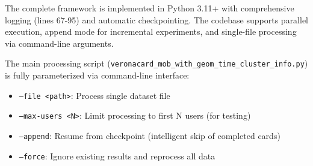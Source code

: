 \documentclass{article}
\begin{document}
The complete framework is implemented in Python 3.11+ with comprehensive logging (lines 67-95) and automatic checkpointing. The codebase supports parallel execution, append mode for incremental experiments, and single-file processing via command-line arguments.

The main processing script (\texttt{veronacard\_mob\_with\_geom\_time\_cluster\_info.py}) is fully parameterized via command-line interface:
\begin{itemize}
    \item \texttt{--file <path>}: Process single dataset file
    \item \texttt{--max-users <N>}: Limit processing to first N users (for testing)
    \item \texttt{--append}: Resume from checkpoint (intelligent skip of completed cards)
    \item \texttt{--force}: Ignore existing results and reprocess all data
\end{itemize}
\end{document}
